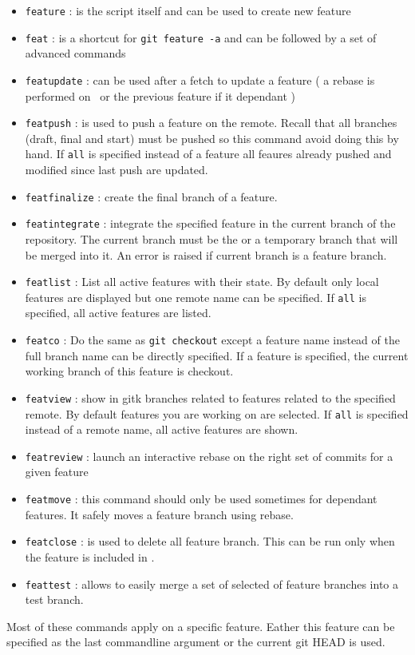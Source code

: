\begin{itemize}
    \item \texttt{feature} : is the script itself and can be used to create new feature
    \item \texttt{feat} : is a shortcut for \texttt{git feature -a} and can be followed by a set of advanced commands
    \item \texttt{featupdate} : can be used after a fetch to update a feature ( a rebase is performed on \DEVREF~or the previous feature if it dependant )
    \item \texttt{featpush} : is used to push a feature on the remote. Recall that all branches (draft, final and start) must be pushed so this command avoid doing this by hand. If \texttt{all} is specified instead of a feature all feaures already pushed and modified since last push are updated.
    \item \texttt{featfinalize} : create the final branch of a feature.
    \item \texttt{featintegrate} : integrate the specified feature in the current branch of the repository. The current branch must be the \DEVREF or a temporary branch that will be merged into it. An error is raised if current branch is a feature branch.
    \item \texttt{featlist} : List all active features with their state. By default only local features are displayed but one remote name can be specified. If \texttt{all} is specified, all active features are listed.
    \item \texttt{featco} : Do the same as \texttt{git checkout} except a feature name instead of the full branch name can be directly specified. If a feature is
    specified, the current working branch of this feature is checkout.
    \item \texttt{featview} : show in gitk branches related to features related to the specified remote. By default features you are working on are selected.
 If \texttt{all} is specified instead of a remote name, all active features are shown.
    \item \texttt{featreview} : launch an interactive rebase on the right set of commits for a given feature
    \item \texttt{featmove} : this command should only be used sometimes for dependant features. It safely moves a feature branch using rebase.
    \item \texttt{featclose} : is used to delete all feature branch. This can be run only when the feature is included in \DEVREF.
    \item \texttt{feattest} : allows to easily merge a set of selected of feature branches into a test branch.
\end{itemize}
Most of these commands apply on a specific feature. Eather this feature can be specified as the last commandline argument or the current git HEAD is used.

